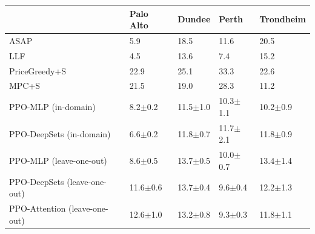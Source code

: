 \begin{tabular}{lllll}
\toprule
 & Palo Alto & Dundee & Perth & Trondheim \\
\midrule
ASAP & 5.9 & 18.5 & 11.6 & 20.5 \\
LLF & 4.5 & 13.6 & 7.4 & 15.2 \\
PriceGreedy+S & 22.9 & 25.1 & 33.3 & 22.6 \\
MPC+S & 21.5 & 19.0 & 28.3 & 11.2 \\
PPO-MLP (in-domain) & 8.2$\pm$0.2 & 11.5$\pm$1.0 & 10.3$\pm$1.1 & 10.2$\pm$0.9 \\
PPO-DeepSets (in-domain) & 6.6$\pm$0.2 & 11.8$\pm$0.7 & 11.7$\pm$2.1 & 11.8$\pm$0.9 \\
PPO-MLP (leave-one-out) & 8.6$\pm$0.5 & 13.7$\pm$0.5 & 10.0$\pm$0.7 & 13.4$\pm$1.4 \\
PPO-DeepSets (leave-one-out) & 11.6$\pm$0.6 & 13.7$\pm$0.4 & 9.6$\pm$0.4 & 12.2$\pm$1.3 \\
PPO-Attention (leave-one-out) & 12.6$\pm$1.0 & 13.2$\pm$0.8 & 9.3$\pm$0.3 & 11.8$\pm$1.1 \\
\bottomrule
\end{tabular}
